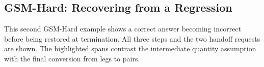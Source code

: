 \FloatBarrier

\subsection{GSM-Hard: Recovering from a Regression}
\label{app:case_gsm_regression}

This second GSM-Hard example shows a correct answer becoming incorrect before being restored at termination. All three steps and the two handoff requests are shown. The highlighted spans contrast the intermediate quantity assumption with the final conversion from legs to pairs.

\begingroup
\setlength{\fboxsep}{7pt}
\endgroup
\par


